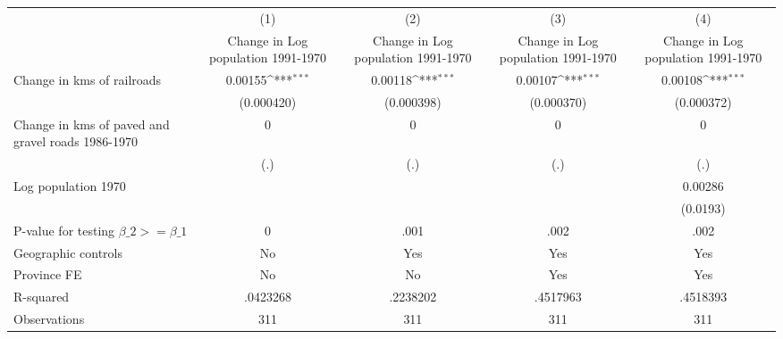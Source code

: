 {
\def\sym#1{\ifmmode^{#1}\else\(^{#1}\)\fi}
\begin{tabular}{l*{4}{c}}
\hline\hline
                &\multicolumn{1}{c}{(1)}&\multicolumn{1}{c}{(2)}&\multicolumn{1}{c}{(3)}&\multicolumn{1}{c}{(4)}\\
                &\multicolumn{1}{c}{Change in Log population 1991-1970}&\multicolumn{1}{c}{Change in Log population 1991-1970}&\multicolumn{1}{c}{Change in Log population 1991-1970}&\multicolumn{1}{c}{Change in Log population 1991-1970}\\
\hline
Change in kms of railroads&  0.00155\sym{***}&  0.00118\sym{***}&  0.00107\sym{***}&  0.00108\sym{***}\\
                &(0.000420)         &(0.000398)         &(0.000370)         &(0.000372)         \\
[1em]
Change in kms of paved and gravel roads 1986-1970&        0         &        0         &        0         &        0         \\
                &      (.)         &      (.)         &      (.)         &      (.)         \\
[1em]
Log population 1970&                  &                  &                  &  0.00286         \\
                &                  &                  &                  & (0.0193)         \\
\hline
P-value for testing $\beta\_{2} >= \beta\_{1}$&        0         &     .001         &     .002         &     .002         \\
Geographic controls&       No         &      Yes         &      Yes         &      Yes         \\
Province FE     &       No         &       No         &      Yes         &      Yes         \\
R-squared       & .0423268         & .2238202         & .4517963         & .4518393         \\
Observations    &      311         &      311         &      311         &      311         \\
\hline\hline
\end{tabular}
}
